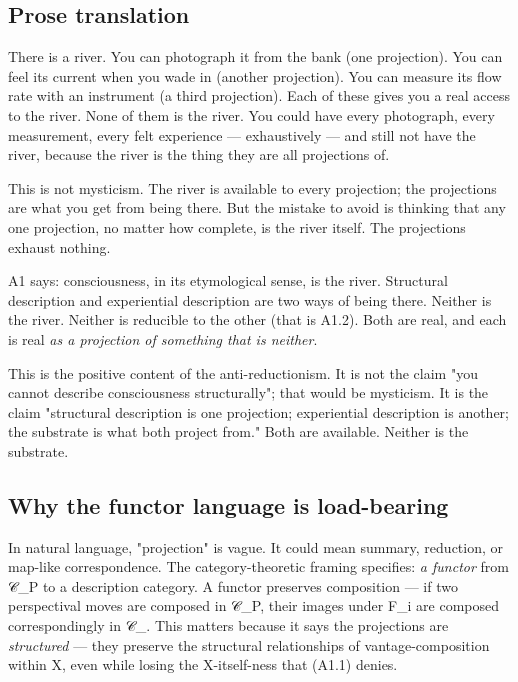 \documentclass[11pt, openany]{book}
\begin{document}
\subsection{Prose translation}

There is a river. You can photograph it from the bank (one projection). You can feel its current when you wade in (another projection). You can measure its flow rate with an instrument (a third projection). Each of these gives you a real access to the river. None of them is the river. You could have every photograph, every measurement, every felt experience --- exhaustively --- and still not have the river, because the river is the thing they are all projections of.

This is not mysticism. The river is available to every projection; the projections are what you get from being there. But the mistake to avoid is thinking that any one projection, no matter how complete, is the river itself. The projections exhaust nothing.

A1 says: consciousness, in its etymological sense, is the river. Structural description and experiential description are two ways of being there. Neither is the river. Neither is reducible to the other (that is A1.2). Both are real, and each is real \textit{as a projection of something that is neither}.

This is the positive content of the anti-reductionism. It is not the claim "you cannot describe consciousness structurally"; that would be mysticism. It is the claim "structural description is one projection; experiential description is another; the substrate is what both project from." Both are available. Neither is the substrate.

\subsection{Why the functor language is load-bearing}

In natural language, "projection" is vague. It could mean summary, reduction, or map-like correspondence. The category-theoretic framing specifies: \textit{a functor} from 𝒞\_\allowbreak{}P to a description category. A functor preserves composition --- if two perspectival moves are composed in 𝒞\_\allowbreak{}P, their images under F\_\allowbreak{}i are composed correspondingly in 𝒞\_. This matters because it says the projections are \textit{structured} --- they preserve the structural relationships of vantage-composition within X, even while losing the X-itself-ness that (A1.1) denies.
\end{document}
